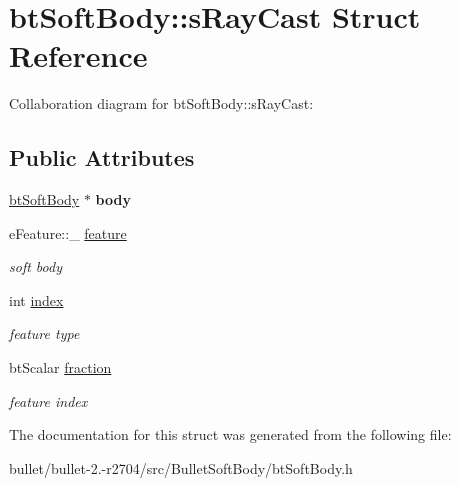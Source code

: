 \hypertarget{structbt_soft_body_1_1s_ray_cast}{\section{bt\+Soft\+Body\+:\+:s\+Ray\+Cast Struct Reference}
\label{structbt_soft_body_1_1s_ray_cast}
}


Collaboration diagram for bt\+Soft\+Body\+:\+:s\+Ray\+Cast\+:
\subsection*{Public Attributes}
\begin{DoxyCompactItemize}
\item 
\hypertarget{structbt_soft_body_1_1s_ray_cast_ad1c73060c43d6de8b0b31b9cb3c9296a}{\hyperlink{classbt_soft_body}{bt\+Soft\+Body} $\ast$ {\bfseries body}}\label{structbt_soft_body_1_1s_ray_cast_ad1c73060c43d6de8b0b31b9cb3c9296a}

\item 
\hypertarget{structbt_soft_body_1_1s_ray_cast_a41cf3cf2defa637a584159ceb7b42c0e}{e\+Feature\+::\+\_\+ \hyperlink{structbt_soft_body_1_1s_ray_cast_a41cf3cf2defa637a584159ceb7b42c0e}{feature}}\label{structbt_soft_body_1_1s_ray_cast_a41cf3cf2defa637a584159ceb7b42c0e}

\begin{DoxyCompactList}\small\item\em soft body \end{DoxyCompactList}\item 
\hypertarget{structbt_soft_body_1_1s_ray_cast_ad0f0741cdacfb4171e226f19368f1b69}{int \hyperlink{structbt_soft_body_1_1s_ray_cast_ad0f0741cdacfb4171e226f19368f1b69}{index}}\label{structbt_soft_body_1_1s_ray_cast_ad0f0741cdacfb4171e226f19368f1b69}

\begin{DoxyCompactList}\small\item\em feature type \end{DoxyCompactList}\item 
\hypertarget{structbt_soft_body_1_1s_ray_cast_ac447ec3fddb58db8beb79c1d7c3ad92b}{bt\+Scalar \hyperlink{structbt_soft_body_1_1s_ray_cast_ac447ec3fddb58db8beb79c1d7c3ad92b}{fraction}}\label{structbt_soft_body_1_1s_ray_cast_ac447ec3fddb58db8beb79c1d7c3ad92b}

\begin{DoxyCompactList}\small\item\em feature index \end{DoxyCompactList}\end{DoxyCompactItemize}


The documentation for this struct was generated from the following file\+:\begin{DoxyCompactItemize}
\item 
bullet/bullet-\/2.-\/r2704/src/\+Bullet\+Soft\+Body/bt\+Soft\+Body.\+h\end{DoxyCompactItemize}

